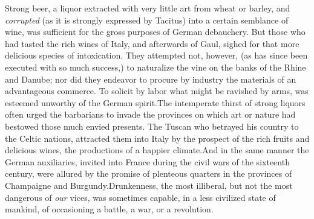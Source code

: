 


Strong beer, a liquor extracted with very little art from wheat
or barley, and \textit{corrupted} (as it is strongly expressed by
Tacitus) into a certain semblance of wine, was sufficient for the
gross purposes of German debauchery. But those who had tasted the
rich wines of Italy, and afterwards of Gaul, sighed for that more
delicious species of intoxication. They attempted not, however,
(as has since been executed with so much success,) to naturalize
the vine on the banks of the Rhine and Danube; nor did they
endeavor to procure by industry the materials of an advantageous
commerce. To solicit by labor what might be ravished by arms, was
esteemed unworthy of the German spirit.\footnotemark[33] The intemperate thirst
of strong liquors often urged the barbarians to invade the
provinces on which art or nature had bestowed those much envied
presents. The Tuscan who betrayed his country to the Celtic
nations, attracted them into Italy by the prospect of the rich
fruits and delicious wines, the productions of a happier climate.\footnotemark[34]
And in the same manner the German auxiliaries, invited into
France during the civil wars of the sixteenth century, were
allured by the promise of plenteous quarters in the provinces of
Champaigne and Burgundy.\footnotemark[35] Drunkenness, the most illiberal, but
not the most dangerous of \textit{our} vices, was sometimes capable, in
a less civilized state of mankind, of occasioning a battle, a
war, or a revolution.




